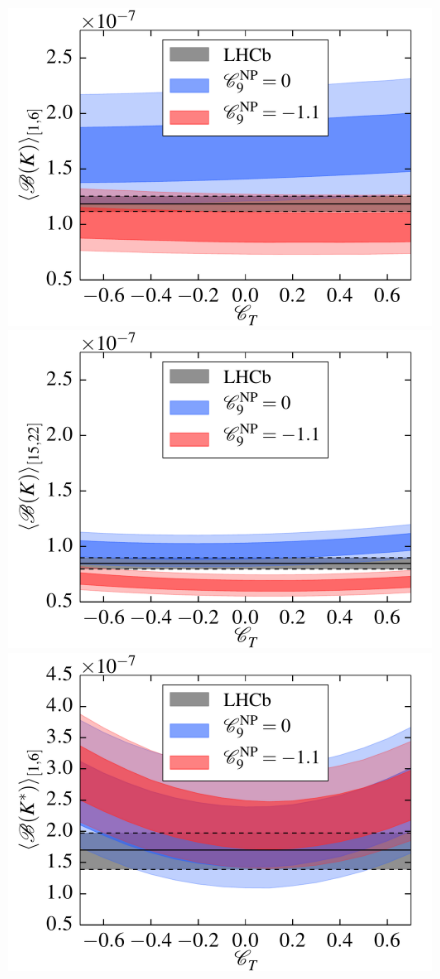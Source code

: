 \documentclass[twocolumn,epjc3]{svjour3}
\numberwithin{equation}{section}
\renewcommand{\[}{\big[}
\renewcommand{\]}{\big]}
\renewcommand{\(}{\big(}
\renewcommand{\)}{\big)}
\newlength{\relwidth}
\begin{document}
\begin{figure}
\begin{center}
    \\
    \includegraphics[width=\relwidth]{plots/pdf/ct_K_BR1to6}
    \includegraphics[width=\relwidth]{plots/pdf/ct_K_BR15to22}
    \\
    \includegraphics[width=\relwidth]{plots/pdf/ct_Kstar_BR1to6}

\end{center}
\end{figure}
\end{document}
